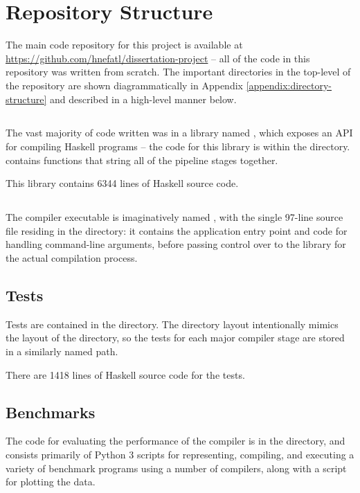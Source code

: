 \documentclass[dissertation.tex]{subfiles}
\begin{document}
\section{Repository Structure}
{
    The main code repository for this project is available at \url{https://github.com/hnefatl/dissertation-project} -- all of the code in this repository was written from scratch. The important directories in the top-level of the repository are shown diagrammatically in Appendix \ref{appendix:directory-structure} and described in a high-level manner below.

    \subsection{}
    {
        The vast majority of code written was in a library named , which exposes an API for compiling Haskell programs -- the code for this library is within the  directory.  contains functions that string all of the pipeline stages together.

        This library contains 6344 lines of Haskell source code.
    }
    \subsection{}
    {
        The compiler executable is imaginatively named , with the single 97-line source file  residing in the  directory: it contains the application entry point and code for handling command-line arguments, before passing control over to the  library for the actual compilation process.
    }
    \subsection{Tests}
    {
        Tests are contained in the  directory. The directory layout intentionally mimics the layout of the  directory, so the tests for each major compiler stage are stored in a similarly named path.

        There are 1418 lines of Haskell source code for the tests.
    }
    \subsection{Benchmarks}
    {
        The code for evaluating the performance of the compiler is in the  directory, and consists primarily of Python 3 scripts for representing, compiling, and executing a variety of benchmark programs using a number of compilers, along with a script for plotting the data.

}}
\end{document}
